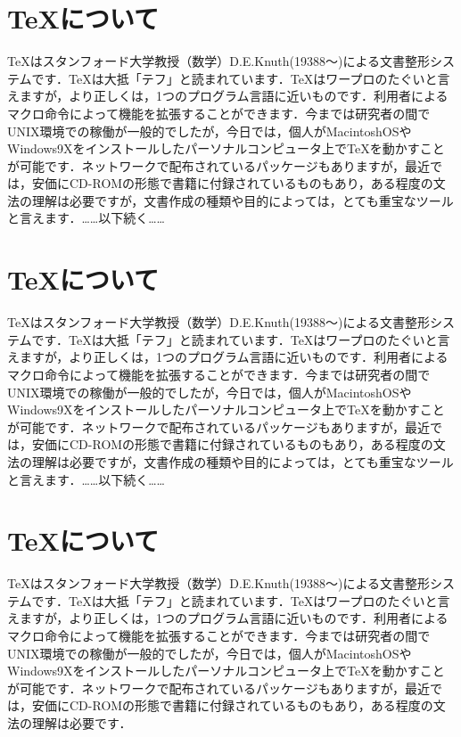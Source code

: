 \documentclass[twocolumn,10pt]{jarticle}
\begin{document}
\section{\TeX について}
TeXはスタンフォード大学教授（数学）D.E.Knuth(19388～)による文書整形システムです．TeXは大抵「テフ」と読まれています．TeXはワープロのたぐいと言えますが，より正しくは，1つのプログラム言語に近いものです．利用者によるマクロ命令によって機能を拡張することができます．今までは研究者の間でUNIX環境での稼働が一般的でしたが，今日では，個人がMacintoshOSやWindows9Xをインストールしたパーソナルコンピュータ上でTeXを動かすことが可能です．ネットワークで配布されているパッケージもありますが，最近では，安価にCD-ROMの形態で書籍に付録されているものもあり，ある程度の文法の理解は必要ですが，文書作成の種類や目的によっては，とても重宝なツールと言えます．……以下続く……
\section{\TeX について}
TeXはスタンフォード大学教授（数学）D.E.Knuth(19388～)による文書整形システムです．TeXは大抵「テフ」と読まれています．TeXはワープロのたぐいと言えますが，より正しくは，1つのプログラム言語に近いものです．利用者によるマクロ命令によって機能を拡張することができます．今までは研究者の間でUNIX環境での稼働が一般的でしたが，今日では，個人がMacintoshOSやWindows9Xをインストールしたパーソナルコンピュータ上でTeXを動かすことが可能です．ネットワークで配布されているパッケージもありますが，最近では，安価にCD-ROMの形態で書籍に付録されているものもあり，ある程度の文法の理解は必要ですが，文書作成の種類や目的によっては，とても重宝なツールと言えます．……以下続く……
\section{\TeX について}
TeXはスタンフォード大学教授（数学）D.E.Knuth(19388～)による文書整形システムです．TeXは大抵「テフ」と読まれています．TeXはワープロのたぐいと言えますが，より正しくは，1つのプログラム言語に近いものです．利用者によるマクロ命令によって機能を拡張することができます．今までは研究者の間でUNIX環境での稼働が一般的でしたが，今日では，個人がMacintoshOSやWindows9Xをインストールしたパーソナルコンピュータ上でTeXを動かすことが可能です．ネットワークで配布されているパッケージもありますが，最近では，安価にCD-ROMの形態で書籍に付録されているものもあり，ある程度の文法の理解は必要です．
\end{document}
